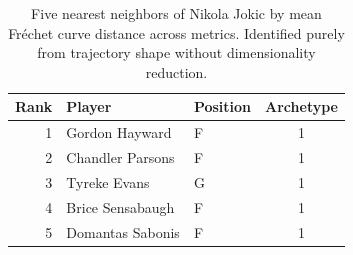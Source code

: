 \begin{table}[htbp]
  \centering\small
  \begin{tabular}{rllc}
    \toprule
    Rank & Player & Position & Archetype \\
    \midrule
    1 & Gordon Hayward & F & 1 \\
    2 & Chandler Parsons & F & 1 \\
    3 & Tyreke Evans & G & 1 \\
    4 & Brice Sensabaugh & F & 1 \\
    5 & Domantas Sabonis & F & 1 \\
    \bottomrule
  \end{tabular}
  \caption{Five nearest neighbors of Nikola Jokic by mean Fr\'{e}chet curve distance across metrics. Identified purely from trajectory shape without dimensionality reduction.}
  \label{tab:Nikola_Jokic_frechet_curve_neighbors}
\end{table}

